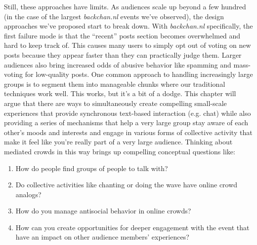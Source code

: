 Still, these approaches have limits. As audiences scale up beyond a few hundred (in the case of the largest \emph{backchan.nl} events we've observed), the design approaches we've proposed start to break down. With \emph{backchan.nl} specifically, the first failure mode is that the ``recent'' posts section becomes overwhelmed and hard to keep track of. This causes many users to simply opt out of voting on new posts because they appear faster than they can practically judge them. Larger audiences also bring increased odds of abusive behavior like spamming and mass-voting for low-quality posts. One common approach to handling increasingly large groups is to segment them into manageable chunks where our traditional techniques work well.  This works, but it's a bit of a dodge. This chapter will argue that there are ways to simultaneously create compelling small-scale experiences that provide synchronous text-based interaction (e.g. chat) while also providing a series of mechanisms that help a very large group stay aware of each other's moods and interests and engage in various forms of collective activity that make it feel like you're really part of a very large audience. Thinking about mediated crowds in this way brings up compelling conceptual questions like: 

\begin{enumerate}
\item{How do people find groups of people to talk with?}
\item{Do collective activities like chanting or doing the wave have online crowd analogs?}
\item{How do you manage antisocial behavior in online crowds?}
\item{How can you create opportunities for deeper engagement with the event that have an impact on other audience members' experiences?}
\end{enumerate}

